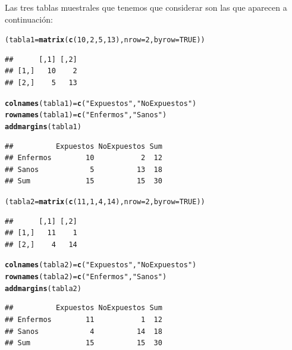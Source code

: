 \documentclass[10pt,a4paper]{article}\usepackage[]{graphicx}\usepackage[]{color}
\makeatletter
\newcommand{\hlnum}[1]{\textcolor[rgb]{0.686,0.059,0.569}{#1}}%
\newcommand{\hlstr}[1]{\textcolor[rgb]{0.192,0.494,0.8}{#1}}%
\newcommand{\hlstd}[1]{\textcolor[rgb]{0.345,0.345,0.345}{#1}}%
\newcommand{\hlkwb}[1]{\textcolor[rgb]{0.69,0.353,0.396}{#1}}%
\newcommand{\hlkwc}[1]{\textcolor[rgb]{0.333,0.667,0.333}{#1}}%
\newcommand{\hlkwd}[1]{\textcolor[rgb]{0.737,0.353,0.396}{\textbf{#1}}}%
\newenvironment{kframe}{%
 \def\at@end@of@kframe{}%
 \ifinner\ifhmode%
  \def\at@end@of@kframe{\end{minipage}}%
  \begin{minipage}{\columnwidth}%
 \fi\fi%
 \def\FrameCommand##1{\hskip\@totalleftmargin \hskip-\fboxsep
 \colorbox{shadecolor}{##1}\hskip-\fboxsep
     \hskip-\linewidth \hskip-\@totalleftmargin \hskip\columnwidth}%
 \MakeFramed {\advance\hsize-\width
   \@totalleftmargin\z@ \linewidth\hsize
   \@setminipage}}%
 {\par\unskip\endMakeFramed%
 \at@end@of@kframe}
\newenvironment{knitrout}{}{} %
\newcounter {cont01}
\makeatother
\begin{document}
Las tres tablas muestrales que tenemos que considerar son las que aparecen a continuación:
\begin{knitrout}
\color{fgcolor}\begin{kframe}
\begin{alltt}
\hlstd{(tabla1} \hlkwb{=} \hlkwd{matrix}\hlstd{(} \hlkwd{c}\hlstd{(}\hlnum{10}\hlstd{,} \hlnum{2}\hlstd{,} \hlnum{5}\hlstd{,} \hlnum{13}\hlstd{),}  \hlkwc{nrow}\hlstd{=} \hlnum{2}\hlstd{,} \hlkwc{byrow} \hlstd{=} \hlnum{TRUE}\hlstd{))}
\end{alltt}
\begin{verbatim}
##      [,1] [,2]
## [1,]   10    2
## [2,]    5   13
\end{verbatim}
\begin{alltt}
\hlkwd{colnames}\hlstd{(tabla1)} \hlkwb{=} \hlkwd{c}\hlstd{(}\hlstr{"Expuestos"}\hlstd{,} \hlstr{"NoExpuestos"}\hlstd{)}
\hlkwd{rownames}\hlstd{(tabla1)} \hlkwb{=} \hlkwd{c}\hlstd{(}\hlstr{"Enfermos"}\hlstd{,} \hlstr{"Sanos"} \hlstd{)}
\hlkwd{addmargins}\hlstd{(tabla1)}
\end{alltt}
\begin{verbatim}
##          Expuestos NoExpuestos Sum
## Enfermos        10           2  12
## Sanos            5          13  18
## Sum             15          15  30
\end{verbatim}
\begin{alltt}
\hlstd{(tabla2} \hlkwb{=} \hlkwd{matrix}\hlstd{(} \hlkwd{c}\hlstd{(}\hlnum{11}\hlstd{,} \hlnum{1}\hlstd{,} \hlnum{4}\hlstd{,} \hlnum{14}\hlstd{),}  \hlkwc{nrow}\hlstd{=} \hlnum{2}\hlstd{,} \hlkwc{byrow} \hlstd{=} \hlnum{TRUE}\hlstd{))}
\end{alltt}
\begin{verbatim}
##      [,1] [,2]
## [1,]   11    1
## [2,]    4   14
\end{verbatim}
\begin{alltt}
\hlkwd{colnames}\hlstd{(tabla2)} \hlkwb{=} \hlkwd{c}\hlstd{(}\hlstr{"Expuestos"}\hlstd{,} \hlstr{"NoExpuestos"}\hlstd{)}
\hlkwd{rownames}\hlstd{(tabla2)} \hlkwb{=} \hlkwd{c}\hlstd{(}\hlstr{"Enfermos"}\hlstd{,} \hlstr{"Sanos"} \hlstd{)}
\hlkwd{addmargins}\hlstd{(tabla2)}
\end{alltt}
\begin{verbatim}
##          Expuestos NoExpuestos Sum
## Enfermos        11           1  12
## Sanos            4          14  18
## Sum             15          15  30
\end{verbatim}
\begin{alltt}

\end{alltt}
\end{kframe}
\end{knitrout}
\end{document}
